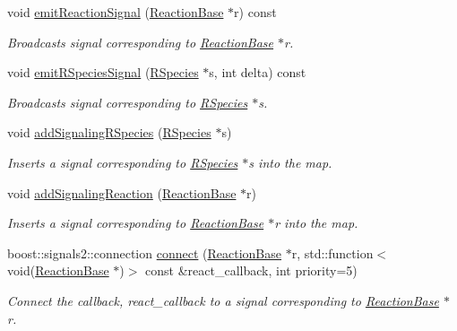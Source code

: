 \begin{DoxyCompactItemize}
\item 
void \hyperlink{classchem_1_1ChemSignal_a1ce27770cc3ce07fc96d558933bc20f9}{emit\-Reaction\-Signal} (\hyperlink{classchem_1_1ReactionBase}{Reaction\-Base} $\ast$r) const 
\begin{DoxyCompactList}\small\item\em Broadcasts signal corresponding to \hyperlink{classchem_1_1ReactionBase}{Reaction\-Base} $\ast$r. \end{DoxyCompactList}\item 
void \hyperlink{classchem_1_1ChemSignal_ab27c28368d6fab40f2d50129108a15bc}{emit\-R\-Species\-Signal} (\hyperlink{classchem_1_1RSpecies}{R\-Species} $\ast$s, int delta) const 
\begin{DoxyCompactList}\small\item\em Broadcasts signal corresponding to \hyperlink{classchem_1_1RSpecies}{R\-Species} $\ast$s. \end{DoxyCompactList}\item 
void \hyperlink{classchem_1_1ChemSignal_a9c370cbe1e3376366c95e95c4aa512e9}{add\-Signaling\-R\-Species} (\hyperlink{classchem_1_1RSpecies}{R\-Species} $\ast$s)
\begin{DoxyCompactList}\small\item\em Inserts a signal corresponding to \hyperlink{classchem_1_1RSpecies}{R\-Species} $\ast$s into the map. \end{DoxyCompactList}\item 
void \hyperlink{classchem_1_1ChemSignal_a67eacb25dd81028c18c48872bef3b1fe}{add\-Signaling\-Reaction} (\hyperlink{classchem_1_1ReactionBase}{Reaction\-Base} $\ast$r)
\begin{DoxyCompactList}\small\item\em Inserts a signal corresponding to \hyperlink{classchem_1_1ReactionBase}{Reaction\-Base} $\ast$r into the map. \end{DoxyCompactList}\item 
boost\-::signals2\-::connection \hyperlink{classchem_1_1ChemSignal_a698e5c6577fae437828ac52238bf0ba0}{connect} (\hyperlink{classchem_1_1ReactionBase}{Reaction\-Base} $\ast$r, std\-::function$<$ void(\hyperlink{classchem_1_1ReactionBase}{Reaction\-Base} $\ast$)$>$ const \&react\-\_\-callback, int priority=5)
\begin{DoxyCompactList}\small\item\em Connect the callback, react\-\_\-callback to a signal corresponding to \hyperlink{classchem_1_1ReactionBase}{Reaction\-Base} $\ast$r. \end{DoxyCompactList}\item 

\end{DoxyCompactItemize}
